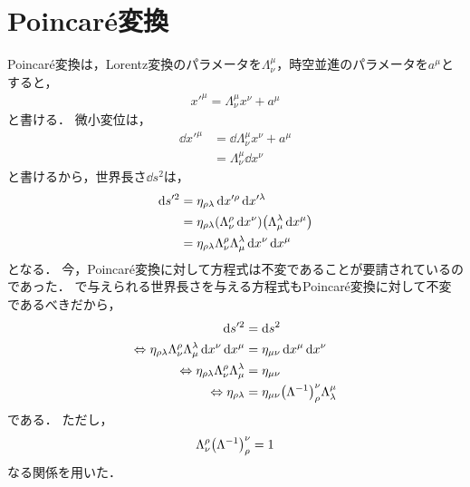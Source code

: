 \documentclass{report}
\begin{document}
  \section{Poincar\'e変換}
    Poincar\'e変換は，Lorentz変換のパラメータを$\Lambda_{\nu}^{\mu}$，時空並進のパラメータを$a^{\mu}$とすると，
    \begin{align}
      x'^{\mu} = \Lambda_{\nu}^{\mu}x^{\nu} + a^{\mu}
    \end{align}
    と書ける．
    微小変位は，
    \begin{align}
      \dd{x'^{\mu}} &= \dd{\Lambda_{\nu}^{\mu}x^{\nu} + a^{\mu}} \\ 
      &= \Lambda_{\nu}^{\mu}\dd{x^{\nu}}
    \end{align}
    と書けるから，世界長さ$\dd{s^2}$は，
    \begin{align}
      \dd{s'^2} &= \eta_{\rho\lambda}\dd{x'^{\rho}}\dd{x'^{\lambda}} \\ 
      &= \eta_{\rho\lambda}\qty(\Lambda_{\nu}^{\rho}\dd{x^{\nu}})\qty(\Lambda_{\mu}^{\lambda}\dd{x^{\mu}}) \\ 
      &= \eta_{\rho\lambda}\Lambda_{\nu}^{\rho}\Lambda_{\mu}^{\lambda}\dd{x^{\nu}}\dd{x^{\mu}}
    \end{align}
    となる．
    今，Poincar\'e変換に対して方程式は不変であることが要請されているのであった．
    で与えられる世界長さを与える方程式もPoincar\'e変換に対して不変であるべきだから，
    \begin{align}
      \dd{s'^2} &= \dd{s^2} \\ 
      \Leftrightarrow \eta_{\rho\lambda}\Lambda_{\nu}^{\rho}\Lambda_{\mu}^{\lambda}\dd{x^{\nu}}\dd{x^{\mu}} &= \eta_{\mu\nu}\dd{x^{\mu}}\dd{x^{\nu}} \\ 
      \Leftrightarrow \eta_{\rho\lambda}\Lambda_{\nu}^{\rho}\Lambda_{\mu}^{\lambda} &= \eta_{\mu\nu} \\ 
      \Leftrightarrow \eta_{\rho\lambda} &= \eta_{\mu\nu}\qty(\Lambda^{-1})_{\rho}^{\nu}\Lambda_{\lambda}^{\mu}
    \end{align}
    である．
    ただし，
    \begin{align}
      \Lambda_{\nu}^{\rho}\qty(\Lambda^{-1})_{\rho}^{\nu} = 1
    \end{align}
    なる関係を用いた．
\end{document}
